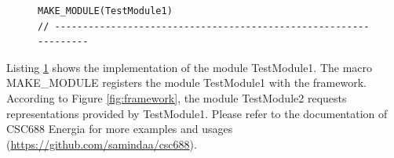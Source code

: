 \documentclass{llncs}
\begin{document}
\begin{sloppy}
\begin{figure}[!ht]
\begin{center}
\begin{verbatim}
MAKE_MODULE(TestModule1)
// -----------------------------------------------------------------
\end{verbatim}
\end{center}
\label{list:TestModule1.cpp}
\end{figure}


Listing \ref{list:TestModule1.cpp} shows the implementation of the module {\sf TestModule1}.  The
macro {\sf MAKE\_MODULE} registers the module {\sf TestModule1} with the framework. According to
Figure \ref{fig:framework}, the module {\sf TestModule2} requests representations provided by {\sf
TestModule1}. Please refer to the documentation of CSC688 Energia for more examples and usages
(\url{https://github.com/samindaa/csc688}).  




\end{sloppy}
\end{document}
